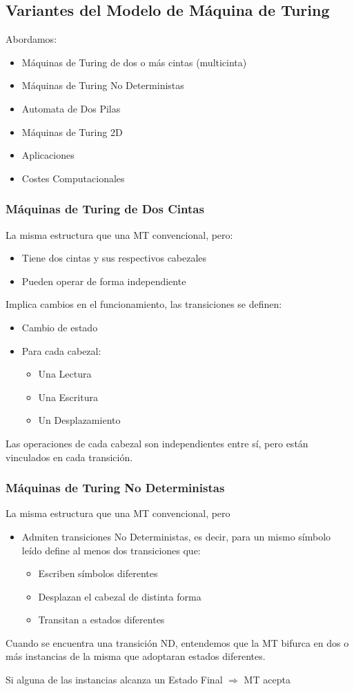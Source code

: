 \subsection{Variantes del Modelo de Máquina de Turing}
Abordamos:
\begin{itemize}
	\item Máquinas de Turing de dos o más cintas (multicinta)
	\item Máquinas de Turing No Deterministas
	\item Automata de Dos Pilas
	\item Máquinas de Turing 2D
	\item Aplicaciones
	\item Costes Computacionales
\end{itemize}

\subsubsection{Máquinas de Turing de Dos Cintas}
La misma estructura que una MT convencional, pero:
\begin{itemize}
	\item Tiene dos cintas y sus respectivos cabezales
	\item Pueden operar de forma independiente
\end{itemize}

Implica cambios en el funcionamiento, las transiciones se definen:
\begin{itemize}
	\item Cambio de estado
	\item Para cada cabezal:
	      \begin{itemize}
		      \item Una Lectura
		      \item Una Escritura
		      \item Un Desplazamiento
	      \end{itemize}
\end{itemize}

Las operaciones de cada cabezal son independientes entre sí, pero están vinculados en cada transición.

\subsubsection{Máquinas de Turing No Deterministas}
La misma estructura que una MT convencional, pero
\begin{itemize}
	\item Admiten transiciones No Deterministas, es decir, para un mismo símbolo leído define al menos dos transiciones que:
	      \begin{itemize}
		      \item Escriben símbolos diferentes
		      \item Desplazan el cabezal de distinta forma
		      \item Transitan a estados diferentes
	      \end{itemize}
\end{itemize}

Cuando se encuentra una transición ND, entendemos que la MT bifurca en dos o más instancias de la misma que adoptaran estados diferentes.

Si alguna de las instancias alcanza un Estado Final $\Rightarrow$ MT acepta
